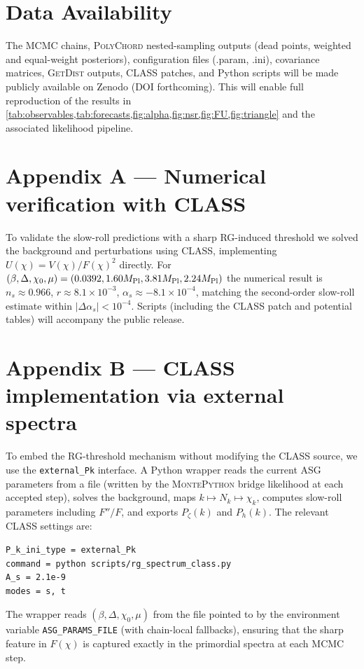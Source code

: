 \documentclass[11pt,a4paper]{article}
\begin{document}
\section{Data Availability}
\label{sec:data}
The MCMC chains, \textsc{PolyChord} nested-sampling outputs (dead points, weighted and equal-weight posteriors), configuration files (.param, .ini), covariance matrices, \textsc{GetDist} outputs, \textsc{CLASS} patches, and Python scripts will be made publicly available on Zenodo (DOI forthcoming). This will enable full reproduction of the results in \cref{tab:observables,tab:forecasts,fig:alpha,fig:nsr,fig:FU,fig:triangle} and the associated likelihood pipeline.

\appendix

\section{Appendix A --- Numerical verification with CLASS}
To validate the slow-roll predictions with a sharp RG-induced threshold we solved the background and perturbations using \textsc{CLASS}, implementing $U(\chi)=V(\chi)/F(\chi)^{2}$ directly. For $(\beta,\Delta,\chi_{0},\mu)=(0.0392,1.60M_{\rm Pl},3.81M_{\rm Pl},2.24M_{\rm Pl})$ the numerical result is $n_{s}\approx0.966$, $r\approx8.1\times10^{-3}$, $\alpha_{s}\approx-8.1\times10^{-4}$, matching the second-order slow-roll estimate within $|\Delta\alpha_{s}|<10^{-4}$. Scripts (including the \textsc{CLASS} patch and potential tables) will accompany the public release.

\section{Appendix B --- CLASS implementation via external spectra}
To embed the RG-threshold mechanism without modifying the \textsc{CLASS} source, we use the \texttt{external\_Pk} interface. A Python wrapper reads the current ASG parameters from a file (written by the \textsc{MontePython} bridge likelihood at each accepted step), solves the background, maps $k\mapsto N_{k}\mapsto \chi_{k}$, computes slow-roll parameters including $F''/F$, and exports $P_{\zeta}(k)$ and $P_{h}(k)$. The relevant \textsc{CLASS} settings are:
\begin{verbatim}
P_k_ini_type = external_Pk
command = python scripts/rg_spectrum_class.py
A_s = 2.1e-9
modes = s, t
\end{verbatim}
The wrapper reads $(\beta,\Delta,\chi_0,\mu)$ from the file pointed to by the environment variable \texttt{ASG\_PARAMS\_FILE} (with chain-local fallbacks), ensuring that the sharp feature in $F(\chi)$ is captured exactly in the primordial spectra at each MCMC step.
\end{document}
